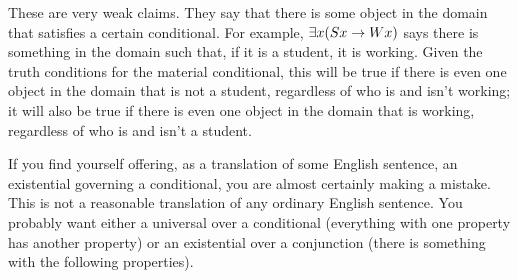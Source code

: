 These are very weak claims. They say that there is some object in the domain that satisfies a certain conditional. For example, $\exists x (Sx \rightarrow Wx)$ says there is something in the domain such that, if it is a student, it is working. Given the truth conditions for the material conditional, this will be true if there is even one object in the domain that is not a student, regardless of who is and isn't working; it will also be true if there is even one object in the domain that is working, regardless of who is and isn't a student.

If you find yourself offering, as a translation of some English sentence, an existential governing a conditional, you are almost certainly making a mistake. This is not a reasonable translation of any ordinary English sentence. You probably want either a universal over a conditional (everything with one property has another property) or an existential over a conjunction (there is something with the following properties). 







\practiceproblems

